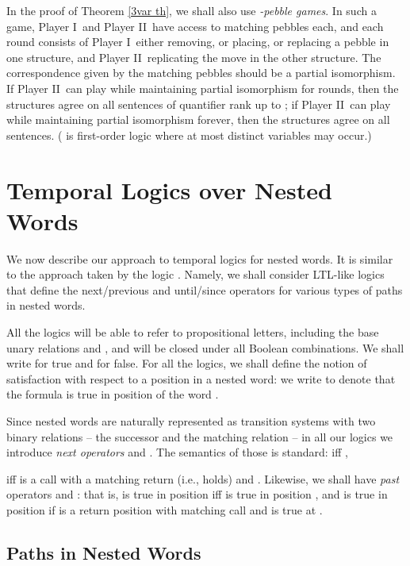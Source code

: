 \documentclass{LMCS}
\newcommand{\dupl}{Player II}
\newcommand{\spoiler}{Player I}
\theoremstyle{plain}
\theoremstyle{definition}
\begin{document}
In the proof of Theorem \ref{3var th}, we shall also use {\em
  -pebble games}. In such a game, \spoiler\ and \dupl\ have access
  to
  matching pebbles each, and each round consists of \spoiler\ 
  either removing, or placing, or replacing a pebble in one structure,
  and \dupl\ replicating the move in the other structure. The
  correspondence given by the matching pebbles should be a partial
  isomorphism. If \dupl\ can play while maintaining partial
  isomorphism for  rounds, then the structures agree on all 
  sentences of quantifier rank up to ; if \dupl\ can play while
  maintaining partial
  isomorphism forever, then the structures agree on all 
  sentences.  ( is first-order logic where at most 
  distinct variables may occur.)


\section{Temporal Logics over Nested Words}
\label{tl-sec}

\noindent We now describe our approach to temporal logics for nested words. It
is similar to the approach taken by the logic
 \cite{AEM04}. Namely, we shall consider LTL-like
logics that define the next/previous and until/since operators for
various types of paths in nested words.

All the logics will be able to refer to propositional letters,
including the base unary relations  and ,
and will be closed under all Boolean  combinations. We shall write 
for true and  for false. For all the logics, we shall define the
notion of satisfaction with respect to a position in a nested word: we
write  to denote that the formula  is true in 
position  of the word .

Since nested words are naturally represented as transition
systems with two binary relations -- the successor and the matching
relation -- in all our logics we introduce {\em next operators} 
and . The semantics of those is standard:  iff , 

iff  is a call with a matching return  (i.e.,  holds)
and .
Likewise, we shall have {\em past} operators  and :
that is,   is true in position
 iff  is true in position , and  is true
in position  
if  is a return position with matching call  and  is true at  .


\subsection{Paths in Nested Words}
\end{document}
